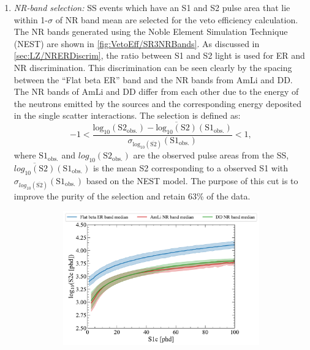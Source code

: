 \begin{enumerate}
	\item \textit{NR-band selection:} SS events which have an S1 and S2 pulse area that lie within 1-$\sigma$ of NR band mean are selected for the veto efficiency calculation.
    The NR bands generated using the Noble Element Simulation Technique (NEST) \cite{NEST2011} are shown in \autoref{fig:VetoEff/SR3NRBands}. As discussed in \autoref{sec:LZ/NRERDiscrim}, the ratio between S1 and S2 light is used for ER and NR discrimination. This discrimination can be seen clearly by the spacing between the ``Flat beta ER'' band and the NR bands from AmLi and DD. The NR bands of AmLi and DD differ from each other due to the energy of the neutrons emitted by the sources and the corresponding energy deposited in the single scatter interactions.
    The selection is defined as:
    \begin{equation}\label{eqn:VetoEff/NRBandSelection}
        -1<\frac{\textrm{log}_{10}(\text{S2}_\text{obs.})-\overline{\textrm{log}_{10}(\text{S2})}(\text{S1}_\text{obs.})}{\sigma_{\textrm{log}_{10}(\overline{\text{S2}})}(\text{S1}_\text{obs.})}<1,
    \end{equation}
    where $\text{S1}_\text{obs.}$ and $log_{10}(\text{S2}_\text{obs.})$ are the observed pulse areas from the SS, $\overline{log_{10}(\text{S2})}(\text{S1}_\text{obs.})$ is the mean S2 corresponding to a observed S1 with $\sigma_{log_{10}(\overline{\text{S2}})}(\text{S1}_\text{obs.})$ based on the NEST model. The purpose of this cut is to improve the purity of the selection and retain 63\% of the data.
    \begin{figure}[!ht]
    \centering
    \begin{subfigure}[b]{0.49\textwidth}
        \centering
        \includegraphics[width=\textwidth]{figures/VetoEfficiency/NRBands.pdf}

\end{subfigure}
\end{figure}
\end{enumerate}
